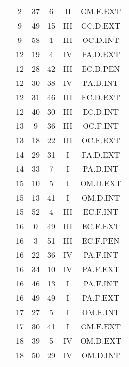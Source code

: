 \documentclass[12pt, a4paper]{article}
\begin{document}
\begin{multicols}{3}
{\begin{tabular}{c c c c c c}
	 	 	 	 & 2 & 37 & 6 & II & OM.F.EXT\\%
	 	 	 	 & 9 & 49 & 15 & III & OC.D.EXT\\%
	 	 	 	 & 9 & 58 & 1 & III & OC.D.INT\\%
	 	 	 	 & 12 & 19 & 4 & IV & PA.D.EXT\\%
	 	 	 	 & 12 & 28 & 42 & III & EC.D.PEN\\%
	 	 	 	 & 12 & 30 & 38 & IV & PA.D.INT\\%
	 	 	 	 & 12 & 31 & 46 & III & EC.D.EXT\\%
	 	 	 	 & 12 & 40 & 30 & III & EC.D.INT\\%
	 	 	 	 & 13 & 9 & 36 & III & OC.F.INT\\%
	 	 	 	 & 13 & 18 & 22 & III & OC.F.EXT\\%
	 	 	 	 & 14 & 29 & 31 & I & PA.D.EXT\\%
	 	 	 	 & 14 & 33 & 7 & I & PA.D.INT\\%
	 	 	 	 & 15 & 10 & 5 & I & OM.D.EXT\\%
	 	 	 	 & 15 & 13 & 41 & I & OM.D.INT\\%
	 	 	 	 & 15 & 52 & 4 & III & EC.F.INT\\%
	 	 	 	 & 16 & 0 & 49 & III & EC.F.EXT\\%
	 	 	 	 & 16 & 3 & 51 & III & EC.F.PEN\\%
	 	 	 	 & 16 & 22 & 36 & IV & PA.F.INT\\%
	 	 	 	 & 16 & 34 & 10 & IV & PA.F.EXT\\%
	 	 	 	 & 16 & 46 & 13 & I & PA.F.INT\\%
	 	 	 	 & 16 & 49 & 49 & I & PA.F.EXT\\%
	 	 	 	 & 17 & 27 & 5 & I & OM.F.INT\\%
	 	 	 	 & 17 & 30 & 41 & I & OM.F.EXT\\%
	 	 	 	 & 18 & 39 & 5 & IV & OM.D.EXT\\%
	 	 	 	 & 18 & 50 & 29 & IV & OM.D.INT\\%
	 	 \end{tabular}
 	}
\end{multicols}
\end{document}
